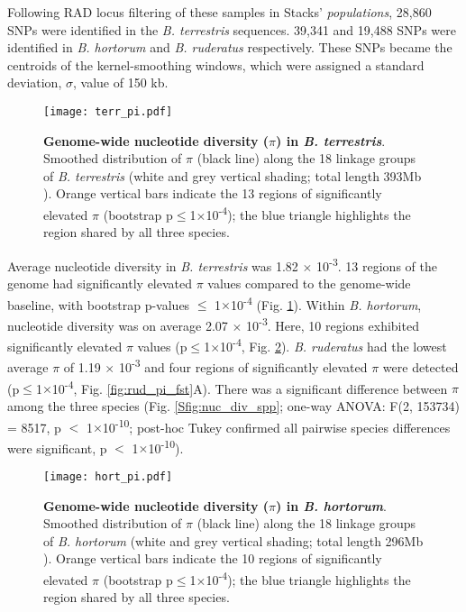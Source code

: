 \documentclass[12pt]{article}
\begin{document}
\begin{linenumbers}
	Following RAD locus filtering of these samples in Stacks' \emph{populations}, 28,860 SNPs were identified in the \emph{B. terrestris} sequences. 39,341 and 19,488 SNPs were identified in \emph{B. hortorum} and \emph{B. ruderatus} respectively. These SNPs became the centroids of the kernel-smoothing windows, which were assigned a standard deviation, $\sigma$, value of 150 kb.
  		
  	\begin{figure}[ht!]
  			\centering
  			\texttt{[image: terr\_pi.pdf]}
  			\captionsetup{width=0.88\linewidth}
  			\caption{\textbf{Genome-wide nucleotide diversity ($\pi$) in \emph{B. terrestris}}. Smoothed distribution of $\pi$ (black line) along the 18 linkage groups of \emph{B. terrestris} (white and grey vertical shading; total length 393Mb  \citep{ncbi_iybomterr12_2022}). Orange vertical bars indicate the 13 regions of significantly elevated $\pi$ (bootstrap p$\leq$1$\times$10\textsuperscript{-4}); the blue triangle highlights the region shared by all three species.}
  			\label{fig:terr_pi}
  	\end{figure}
  	
    Average nucleotide diversity in \emph{B. terrestris} was 1.82 $\times$ 10\textsuperscript{-3}. 13 regions of the genome had significantly elevated $\pi$ values compared to the genome-wide baseline, with bootstrap p-values $\leq$ 1$\times$10\textsuperscript{-4} (Fig. \ref{fig:terr_pi}). 
    Within \emph{B. hortorum}, nucleotide diversity was on average 2.07 $\times$ 10\textsuperscript{-3}. Here, 10 regions exhibited significantly elevated $\pi$ values (p$\leq$1$\times$10\textsuperscript{-4}, Fig. \ref{fig:hort_pi}). 
    \emph{B. ruderatus} had the lowest average $\pi$ of 1.19 $\times$ 10\textsuperscript{-3} and four regions of significantly elevated $\pi$ were detected (p$\leq$1$\times$10\textsuperscript{-4}, Fig. \ref{fig:rud_pi_fst}A).
    There was a significant difference between $\pi$ among the three species (Fig. \ref{Sfig:nuc_div_spp}; one-way ANOVA: F(2, 153734) = 8517, p $<$ 1$\times$10\textsuperscript{-10}; post-hoc Tukey confirmed all pairwise species differences were significant, p $<$ 1$\times$10\textsuperscript{-10}). 
    
	\begin{figure}[ht!]
		\centering
		\texttt{[image: hort\_pi.pdf]}
		\captionsetup{width=0.88\linewidth}
		\caption{\textbf{Genome-wide nucleotide diversity ($\pi$) in \emph{B. hortorum}}. Smoothed distribution of $\pi$ (black line) along the 18 linkage groups of \emph{B. hortorum} (white and grey vertical shading; total length 296Mb \citep{ncbi_iybomhort11_2021}). Orange vertical bars indicate the 10 regions of significantly elevated $\pi$ (bootstrap p$\leq$1$\times$10\textsuperscript{-4}); the blue triangle highlights the region shared by all three species.}
		\label{fig:hort_pi}
	\end{figure}


\end{linenumbers}
\end{document}
